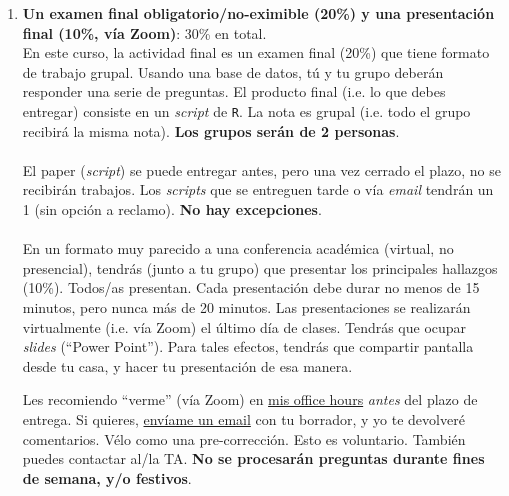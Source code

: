 \documentclass[letterpaper]{article}
\begin{document}
\begin{enumerate}
\begin{enumerate}
		\item[\Pointinghand] {\bf Aunque no es necesario, s\'i puedes ocupar recursos externos, como Internet}.
		\item[\Pointinghand] Es importante que estas l\'ineas corran bien: el usuario (yo) tiene que ser cap\'az de ver como \texttt{R} ejecuta cada l\'inea, sin ``estancarse''.
		\item[\Pointinghand] Es importante que vayas guiando al usuario (yo) sobre tu raciocinio. Aseg\'urate de comentar (usando el s\'imbolo \texttt{\#}).
\end{enumerate}


	\item {\bf Un examen final obligatorio/no-eximible (20\%) y una presentaci\'on final (10\%, v\'ia Zoom)}: 30\% en total.\\


En este curso, la actividad final es un examen final (20\%) que tiene formato de trabajo grupal. Usando una base de datos, t\'u y tu grupo deber\'an responder una serie de preguntas. El producto final (i.e. lo que debes entregar) consiste en un \emph{script} de \texttt{R}. La nota es grupal (i.e. todo el grupo recibir\'a la misma nota). {\bf Los grupos ser\'an de 2 personas}.
\\
\\
El paper (\emph{script}) se puede entregar antes, pero una vez cerrado el plazo, no se recibir\'an trabajos. Los \emph{scripts} que se entreguen tarde o v\'ia \emph{email} tendr\'an un 1 (sin opci\'on a reclamo). {\bf No hay excepciones}. 
\\
\\
En un formato muy parecido a una conferencia acad\'emica (virtual, no presencial), tendr\'as (junto a tu grupo) que presentar los principales hallazgos (10\%). Todos/as presentan. Cada presentaci\'on debe durar no menos de 15 minutos, pero nunca m\'as de 20 minutos. Las presentaciones se realizar\'an virtualmente (i.e. v\'ia Zoom) el \'ultimo d\'ia de clases. Tendr\'as que ocupar \emph{slides} (``Power Point''). Para tales efectos, tendr\'as que compartir pantalla desde tu casa, y hacer tu presentaci\'on de esa manera.



Les recomiendo ``verme'' (v\'ia Zoom) en \href{https://calendly.com/bahamonde/officehours}{mis office hours} \emph{antes} del plazo de entrega. Si quieres, \href{mailto:\filetext}{env\'iame un email} con tu borrador, y yo te devolver\'e comentarios. V\'elo como una pre-correcci\'on. Esto es voluntario. Tambi\'en puedes contactar al/la TA. {\bf No se procesar\'an preguntas durante fines de semana, y/o festivos}.


\end{enumerate}
\end{document}
